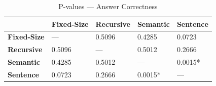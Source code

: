 \begin{table}
\caption{P-values — Answer Correctness}
\label{tab:pvalues_answer_correctness}
\begin{tabular}{lllll}
\toprule
 & Fixed-Size & Recursive & Semantic & Sentence \\
\midrule
\textbf{Fixed-Size} & — & 0.5096 & 0.4285 & 0.0723 \\
\textbf{Recursive} & 0.5096 & — & 0.5012 & 0.2666 \\
\textbf{Semantic} & 0.4285 & 0.5012 & — & 0.0015* \\
\textbf{Sentence} & 0.0723 & 0.2666 & 0.0015* & — \\
\bottomrule
\end{tabular}
\end{table}

